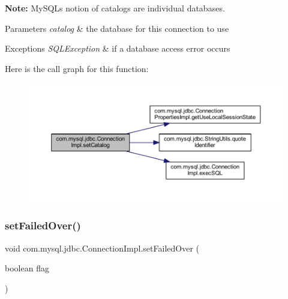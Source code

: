 {\bfseries Note\+:} My\+S\+QL\textquotesingle{}s notion of catalogs are individual databases. 


\begin{DoxyParams}{Parameters}
{\em catalog} & the database for this connection to use \\
\hline
\end{DoxyParams}

\begin{DoxyExceptions}{Exceptions}
{\em S\+Q\+L\+Exception} & if a database access error occurs \\
\hline
\end{DoxyExceptions}
Here is the call graph for this function\+:\nopagebreak
\begin{figure}[H]
\begin{center}
\leavevmode
\includegraphics[width=350pt]{classcom_1_1mysql_1_1jdbc_1_1_connection_impl_a70eceba08a9ec6b4e248e053d62ddc40_cgraph}
\end{center}
\end{figure}
\mbox{\label{classcom_1_1mysql_1_1jdbc_1_1_connection_impl_aae5bb4c31a9c4260599f64e7cbec0a7a}} 
\subsubsection{\texorpdfstring{set\+Failed\+Over()}{setFailedOver()}}
{\footnotesize\ttfamily void com.\+mysql.\+jdbc.\+Connection\+Impl.\+set\+Failed\+Over (\begin{DoxyParamCaption}\item[{boolean}]{flag }\end{DoxyParamCaption})}


